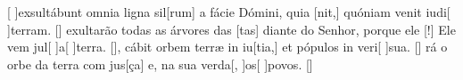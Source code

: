 {  %
  {[ ]{ex}sultábunt omnia ligna sil[rum] a fácie Dómini, quia [nit,] quóniam venit iudi[ ]{ter}ram. [\LinkLA]}%
    { exultarão todas as árvores das [tas] diante do Senhor, porque ele [!] Ele vem jul[ ]{a}[ ]{ter}ra. [\LinkPT]},
  {cábit orbem terræ in iu[tia,] et pópulos in veri[ ]{su}a. [\LinkLA]}%
    {rá o orbe da terra com jus[ça] e, na sua verda[, ]{os}[ ]{po}vos. [\LinkPT]}

}